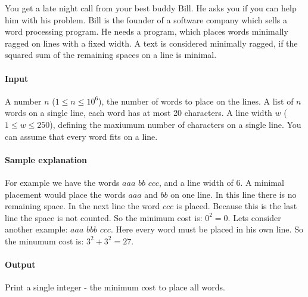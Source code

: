



\makeheader

You get a late night call from your best buddy Bill. He asks you if you can help him with his problem.
Bill is the founder of a software company which sells a word processing program. He needs a program, which places words minimally ragged on lines with a fixed width.
A text is considered minimally ragged, if the squared sum of the remaining spaces on a line is minimal.

\paragraph*{Input}
A number $n$ ($1 \leq n \leq 10^6$), the number of words to place on the lines.
A list of $n$ words on a single line, each word has at most 20 characters. 
A line width $w$ ($1 \leq w \leq 250$), defining the maxiumum number of characters on a single line.
You can assume that every word fits on a line.

\paragraph*{Sample explanation}
For example we have the words $aaa$ $bb$ $ccc$, and a line width of 6.
A minimal placement would place the words $aaa$ and $bb$ on one line. In this line there is no remaining space.
In the next line the word $ccc$ is placed. Because this is the last line the space is not counted.
So the minimum cost is: $0^2 = 0$.
Lets consider another example: $aaa$ $bbb$ $ccc$. Here every word must be placed in his own line.
So the minumum cost is: $3^2+3^2= 27$.

\paragraph*{Output}

Print a single integer - the minimum cost to place all words.

\begin{samples}
\end{samples}

